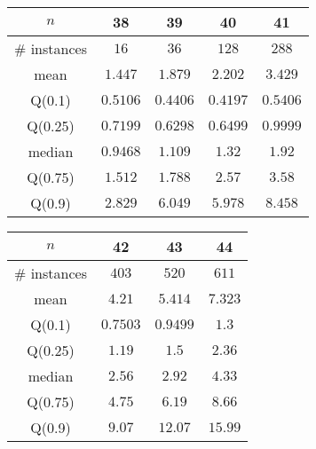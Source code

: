\begin{tabular}{c|cccc} 
\hline 
$n$ & 38 & 39 & 40 & 41 \tabularnewline 
\hline 
\hline 
\# instances & $16$ & $36$ & $128$ & $288$ \tabularnewline 
mean & $1.447$ & $1.879$ & $2.202$ & $3.429$ \tabularnewline 
Q(0.1) & $0.5106$ & $0.4406$ & $0.4197$ & $0.5406$ \tabularnewline 
Q(0.25) & $0.7199$ & $0.6298$ & $0.6499$ & $0.9999$ \tabularnewline 
median & $0.9468$ & $1.109$ & $1.32$ & $1.92$ \tabularnewline 
Q(0.75) & $1.512$ & $1.788$ & $2.57$ & $3.58$ \tabularnewline 
Q(0.9) & $2.829$ & $6.049$ & $5.978$ & $8.458$ \tabularnewline 
\hline 
\end{tabular} 
\medskip{} 

\begin{tabular}{c|ccc} 
\hline 
$n$ & 42 & 43 & 44 \tabularnewline 
\hline 
\hline 
\# instances & $403$ & $520$ & $611$ \tabularnewline 
mean & $4.21$ & $5.414$ & $7.323$ \tabularnewline 
Q(0.1) & $0.7503$ & $0.9499$ & $1.3$ \tabularnewline 
Q(0.25) & $1.19$ & $1.5$ & $2.36$ \tabularnewline 
median & $2.56$ & $2.92$ & $4.33$ \tabularnewline 
Q(0.75) & $4.75$ & $6.19$ & $8.66$ \tabularnewline 
Q(0.9) & $9.07$ & $12.07$ & $15.99$ \tabularnewline 
\hline 
\end{tabular} 
\medskip{} 

